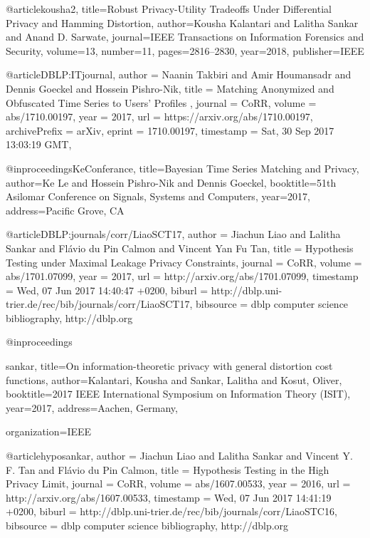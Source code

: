 



@article{kousha2,
	title={Robust Privacy-Utility Tradeoffs Under Differential Privacy and Hamming Distortion},
	author={Kousha Kalantari and Lalitha Sankar and Anand D. Sarwate},
	journal={IEEE Transactions on Information Forensics and Security},
	volume={13},
	number={11},
	pages={2816--2830},
	year={2018},
	publisher={IEEE}
}



@article{DBLP:ITjournal,
  author    = {Naanin Takbiri and
               Amir Houmansadr and
               Dennis Goeckel and
               Hossein Pishro-Nik},
  title     = {Matching Anonymized and Obfuscated Time Series to Users' Profiles
},
  journal   = {CoRR},
  volume    = {abs/1710.00197},
  year      = {2017},
  url       = {https://arxiv.org/abs/1710.00197},
  archivePrefix = {arXiv},
  eprint    = {1710.00197},
  timestamp = {Sat, 30 Sep 2017 13:03:19 GMT},
}


@inproceedings{KeConferance,
   title={Bayesian Time Series Matching and Privacy},
    author={Ke Le and 	Hossein Pishro-Nik and Dennis Goeckel},
	booktitle={51th Asilomar Conference on Signals, Systems and Computers},
   year={2017},
  	address={Pacific Grove, CA}
   }	

@article{DBLP:journals/corr/LiaoSCT17,
  author    = {Jiachun Liao and
               Lalitha Sankar and
               Fl{\'{a}}vio du Pin Calmon and
               Vincent Yan Fu Tan},
  title     = {Hypothesis Testing under Maximal Leakage Privacy Constraints},
  journal   = {CoRR},
  volume    = {abs/1701.07099},
  year      = {2017},
  url       = {http://arxiv.org/abs/1701.07099},
  timestamp = {Wed, 07 Jun 2017 14:40:47 +0200},
  biburl    = {http://dblp.uni-trier.de/rec/bib/journals/corr/LiaoSCT17},
  bibsource = {dblp computer science bibliography, http://dblp.org}
}


@inproceedings{sankar,
    title={On information-theoretic privacy with general distortion cost functions},
    author={Kalantari, Kousha and Sankar, Lalitha and  Kosut, Oliver},
    booktitle={2017 IEEE International Symposium on Information Theory (ISIT)},
    year={2017},
      	address={Aachen, Germany},

    organization={IEEE}
    
  }	


@article{hyposankar,
  author    = {Jiachun Liao and
               Lalitha Sankar and
               Vincent Y. F. Tan and
               Fl{\'{a}}vio du Pin Calmon},
  title     = {Hypothesis Testing in the High Privacy Limit},
  journal   = {CoRR},
  volume    = {abs/1607.00533},
  year      = {2016},
  url       = {http://arxiv.org/abs/1607.00533},
  timestamp = {Wed, 07 Jun 2017 14:41:19 +0200},
  biburl    = {http://dblp.uni-trier.de/rec/bib/journals/corr/LiaoSTC16},
  bibsource = {dblp computer science bibliography, http://dblp.org}
}

